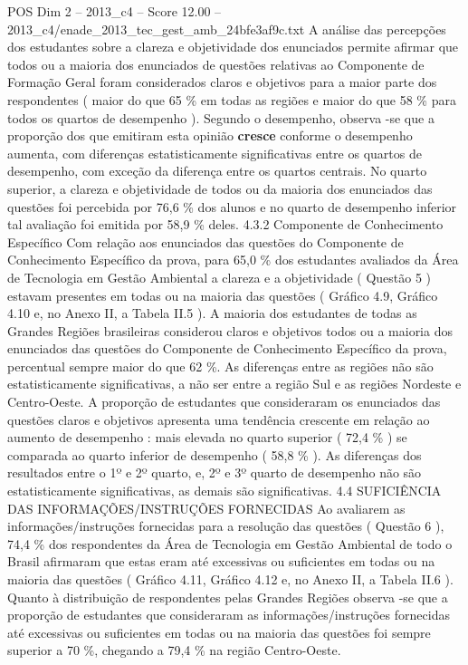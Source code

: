 \begin{textsample}{POS Dim 2 – 2013\_c4 – Score 12.00 – 2013\_c4/enade\_2013\_tec\_gest\_amb\_24bfe3af9c.txt}
A análise das percepções dos estudantes sobre a clareza e objetividade dos enunciados permite afirmar que todos ou a maioria dos enunciados de questões relativas ao Componente de Formação Geral foram considerados claros e objetivos para a maior parte dos respondentes ( maior do que 65 \% em todas as regiões e maior do que 58 \% para todos os quartos de desempenho ).
Segundo o desempenho, observa -se que a proporção dos que emitiram esta opinião \textbf{cresce} conforme o desempenho aumenta, com diferenças estatisticamente significativas entre os quartos de desempenho, com exceção da diferença entre os quartos centrais.
No quarto superior, a clareza e objetividade de todos ou da maioria dos enunciados das questões foi percebida por 76,6 \% dos alunos e no quarto de desempenho inferior tal avaliação foi emitida por 58,9 \% deles. 4.3.2 Componente de Conhecimento Específico Com relação aos enunciados das questões do Componente de Conhecimento Específico da prova, para 65,0 \% dos estudantes avaliados da Área de Tecnologia em Gestão Ambiental a clareza e a objetividade ( Questão 5 ) estavam presentes em todas ou na maioria das questões ( Gráfico 4.9, Gráfico 4.10 e, no Anexo II, a Tabela II.5 ).
A maioria dos estudantes de todas as Grandes Regiões brasileiras considerou claros e objetivos todos ou a maioria dos enunciados das questões do Componente de Conhecimento Específico da prova, percentual sempre maior do que 62 \%.
As diferenças entre as regiões não são estatisticamente significativas, a não ser entre a região Sul e as regiões Nordeste e Centro-Oeste.
A proporção de estudantes que consideraram os enunciados das questões claros e objetivos apresenta uma tendência crescente em relação ao aumento de desempenho : mais elevada no quarto superior ( 72,4 \% ) se comparada ao quarto inferior de desempenho ( 58,8 \% ).
As diferenças dos resultados entre o 1º e 2º quarto, e, 2º e 3º quarto de desempenho não são estatisticamente significativas, as demais são significativas. 4.4 SUFICIÊNCIA DAS INFORMAÇÕES/INSTRUÇÕES FORNECIDAS Ao avaliarem as informações/instruções fornecidas para a resolução das questões ( Questão 6 ), 74,4 \% dos respondentes da Área de Tecnologia em Gestão Ambiental de todo o Brasil afirmaram que estas eram até excessivas ou suficientes em todas ou na maioria das questões ( Gráfico 4.11, Gráfico 4.12 e, no Anexo II, a Tabela II.6 ).
Quanto à distribuição de respondentes pelas Grandes Regiões observa -se que a proporção de estudantes que consideraram as informações/instruções fornecidas até excessivas ou suficientes em todas ou na maioria das questões foi sempre superior a 70 \%, chegando a 79,4 \% na região Centro-Oeste.

\end{textsample}
